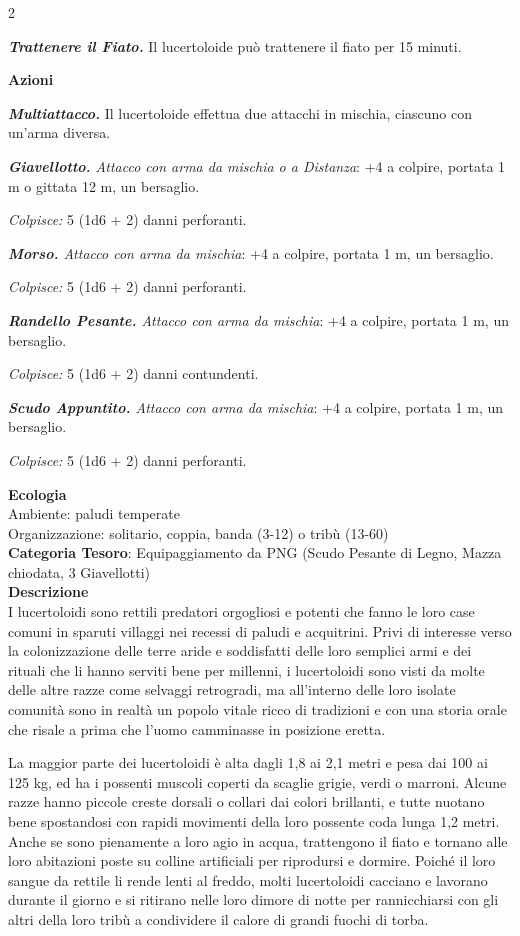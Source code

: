 \begin{multicols}{2}
{\emph{\textbf{Trattenere il Fiato.}} Il lucertoloide può trattenere il fiato per 15 minuti.

\textbf{Azioni}

\emph{\textbf{Multiattacco.}} Il lucertoloide effettua due attacchi in mischia, ciascuno con un'arma diversa.

\emph{\textbf{Giavellotto.} Attacco con arma da mischia o a Distanza}: +4 a colpire, portata 1 m o gittata 12 m, un bersaglio.

\emph{Colpisce:} 5 (1d6 + 2) danni perforanti.

\emph{\textbf{Morso.} Attacco con arma da mischia}: +4 a colpire, portata 1 m, un bersaglio.

\emph{Colpisce:} 5 (1d6 + 2) danni perforanti.

\emph{\textbf{Randello Pesante.} Attacco con arma da mischia}: +4 a colpire, portata 1 m, un bersaglio.

\emph{Colpisce:} 5 (1d6 + 2) danni contundenti.

\emph{\textbf{Scudo Appuntito.} Attacco con arma da mischia}: +4 a colpire, portata 1 m, un bersaglio.

\emph{Colpisce:} 5 (1d6 + 2) danni perforanti.

\textbf{Ecologia}\\
Ambiente: paludi temperate\\
Organizzazione: solitario, coppia, banda (3-12) o tribù (13-60)\\
\textbf{Categoria Tesoro}: Equipaggiamento da PNG (Scudo Pesante di Legno, Mazza chiodata, 3 Giavellotti)\\

\textbf{Descrizione}\\
I lucertoloidi sono rettili predatori orgogliosi e potenti che fanno le loro case comuni in sparuti villaggi nei recessi di paludi e acquitrini. Privi di interesse verso la colonizzazione delle terre aride e soddisfatti delle loro semplici armi e dei rituali che li hanno serviti bene per millenni, i lucertoloidi sono visti da molte delle altre razze come selvaggi retrogradi, ma all'interno delle loro isolate comunità sono in realtà un popolo vitale ricco di tradizioni e con una storia orale che risale a prima che l'uomo camminasse in posizione eretta.

La maggior parte dei lucertoloidi è alta dagli 1,8 ai 2,1 metri e pesa dai 100 ai 125 kg, ed ha i possenti muscoli coperti da scaglie grigie, verdi o marroni. Alcune razze hanno piccole creste dorsali o collari dai colori brillanti, e tutte nuotano bene spostandosi con rapidi movimenti della loro possente coda lunga 1,2 metri. Anche se sono pienamente a loro agio in acqua, trattengono il fiato e tornano alle loro abitazioni poste su colline artificiali per riprodursi e dormire. Poiché il loro sangue da rettile li rende lenti al freddo, molti lucertoloidi cacciano e lavorano durante il giorno e si ritirano nelle loro dimore di notte per rannicchiarsi con gli altri della loro tribù a condividere il calore di grandi fuochi di torba.

}
\end{multicols}
